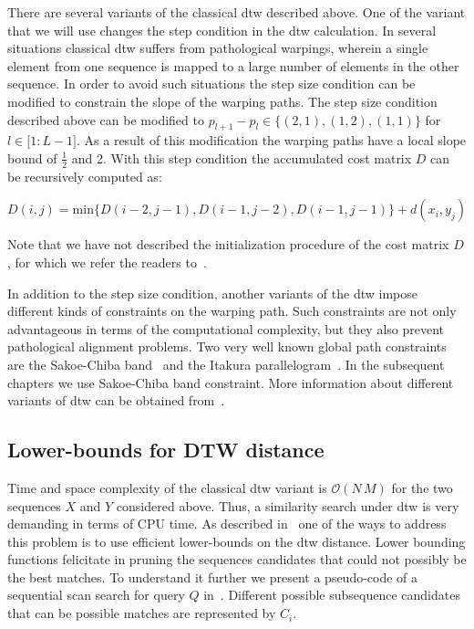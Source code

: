 There are several variants of the classical \gls{dtw} described above. One of the variant that we will use changes the step condition in the \gls{dtw} calculation. In several situations classical \gls{dtw} suffers from pathological warpings, wherein a single element from one sequence is mapped to a large number of elements in the other sequence. In order to avoid such situations the step size condition can be modified to constrain the slope of the warping paths. The step size condition described above can be modified to $p_{l+1}-p_l \in \lbrace (2,1), (1,2), (1,1) \rbrace$ for $l \in \lbrack 1: L-1 \rbrack$. As a result of this modification the warping paths have a local slope bound of $\frac{1}{2}$ and 2. With this step condition the accumulated cost matrix $D$ can be recursively computed as:

\begin{equation}
\label{eq:dtw_local_constraint_cost_matrix_computation}
D(i,j) = \mathrm{min} \lbrace D(i-2,j-1), D(i-1,j-2), D(i-1,j-1)\rbrace + d(x_i, y_j)
\end{equation}

Note that we have not described the initialization procedure of the cost matrix $D$, for which we refer the readers to~\cite{muller2007dynamic}.

In addition to the step size condition, another variants of the \gls{dtw} impose different kinds of constraints on the warping path. Such constraints are not only advantageous in terms of the computational complexity, but they also prevent pathological alignment problems. Two very well known global path constraints are the Sakoe-Chiba band~\citep{Sakoe78TASLP} and the Itakura parallelogram~\citep{itakura1975minimum}. In the subsequent chapters we use Sakoe-Chiba band constraint. More information about different variants of \gls{dtw} can be obtained from~\citep{rabiner1993fundamentals,muller2007dynamic}.

\subsection{Lower-bounds for DTW distance}
\label{sec:background_lowerbound}

Time and space complexity of the classical \gls{dtw} variant is $\mathcal{O}(N\,M)$ for the two sequences $X$ and $Y$ considered above. Thus, a similarity search under \gls{dtw} is very demanding in terms of CPU time. As described in~\cite{Keogh2004} one of the ways to address this problem is to use efficient lower-bounds on the \gls{dtw} distance. Lower bounding functions felicitate in pruning the sequences candidates that could not possibly be the best matches. To understand it further we present a pseudo-code of a sequential scan search for query $Q$ in~. Different possible subsequence candidates that can be possible matches are represented by $C_i$.%

